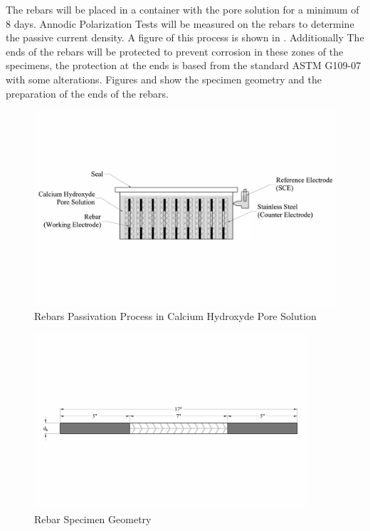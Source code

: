 The rebars will be placed in a container with the pore solution for a minimum of 8 days. Annodic Polarization Tests will be measured on the rebars to determine the passive current density. A figure of this process is shown in . Additionally The ends of the rebars will be protected to prevent corrosion in these zones of the specimens, the protection at the ends is based from the standard ASTM G109-07 with some alterations. Figures  and  show the specimen geometry and the preparation of the ends of the rebars.

\begin{figure}[htbp]
	\centering
	\includegraphics[width=1.0\textwidth]{Chapter-4/figs/AnodicPolarization_01}
	\caption{Rebars Passivation Process in Calcium Hydroxyde Pore Solution}
	\label{fig:RebarPassivation}
\end{figure}

\begin{figure}[htbp]
	\centering
	\includegraphics[width=0.9\textwidth]{Chapter-4/figs/RebarSamples}
	\caption{Rebar Specimen Geometry}
	\label{fig:RebarSpecimenGeomtry}
\end{figure}

